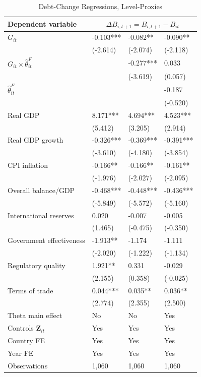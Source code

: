 \begin{table}[H]\centering
\begin{threeparttable}
\caption{Debt-Change Regressions, Level-Proxies}
\label{tab:appc_debt_change}
\scriptsize
\setlength{\tabcolsep}{3.0pt}
\begin{tabularx}{\textwidth}{lYYY}
\toprule
Dependent variable &  \\
\midrule
$G_{it}$ & -0.103*** & -0.082** & -0.090** \\
 & (-2.614) & (-2.074) & (-2.118) \\
$G_{it}\times\widehat\theta^F_{it}$ &  & -0.277*** & 0.033 \\
 &  & (-3.619) & (0.057) \\
$\widehat\theta^F_{it}$ &  &  & -0.187 \\
 &  &  & (-0.520) \\
Real GDP & 8.171*** & 4.694*** & 4.523*** \\
 & (5.412) & (3.205) & (2.914) \\
Real GDP growth & -0.326*** & -0.369*** & -0.391*** \\
 & (-3.610) & (-4.180) & (-3.854) \\
CPI inflation & -0.166** & -0.166** & -0.161** \\
 & (-1.976) & (-2.027) & (-2.095) \\
Overall balance/GDP & -0.468*** & -0.448*** & -0.436*** \\
 & (-5.849) & (-5.572) & (-5.160) \\
International reserves & 0.020 & -0.007 & -0.005 \\
 & (1.465) & (-0.475) & (-0.350) \\
Government effectiveness & -1.913** & -1.174 & -1.111 \\
 & (-2.020) & (-1.222) & (-1.134) \\
Regulatory quality & 1.921** & 0.331 & -0.029 \\
 & (2.155) & (0.358) & (-0.025) \\
Terms of trade & 0.044*** & 0.035** & 0.036** \\
 & (2.774) & (2.355) & (2.500) \\
\midrule
Theta main effect & No & No & Yes \\
Controls $\mathbf{Z}_{it}$ & Yes & Yes & Yes \\
Country FE & Yes & Yes & Yes \\
Year FE & Yes & Yes & Yes \\
Observations & 1,060 & 1,060 & 1,060 \\

\end{tabularx}
\end{threeparttable}
\end{table}
